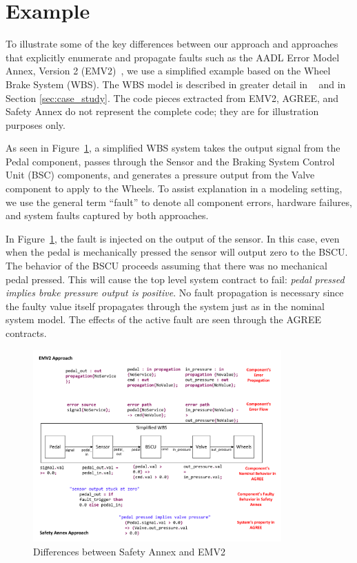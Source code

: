 \section{Example}
\label{sec:comparison_with_EMV2}

To illustrate some of the key differences between our approach and approaches that explicitly enumerate and propagate faults such as the AADL Error Model Annex, Version 2 (EMV2)~\cite{EMV2}, we use a simplified example based on the Wheel Brake System (WBS). The WBS model is described in greater detail in ~\cite{Stewart17:IMBSA} and in Section \ref{sec:case_study}. The code pieces extracted from EMV2, AGREE, and Safety Annex do not represent the complete code; they are for illustration purposes only.

As seen in Figure~\ref{fig:comparison_with_EMV2}, a simplified WBS system takes the output signal from the Pedal component, passes through the Sensor and the Braking System Control Unit (BSC) components, and generates a pressure output from the Valve component to apply to the Wheels. To assist explanation in a modeling setting, we use the general term ``fault'' to denote all component errors, hardware failures, and system faults captured by both approaches.

In Figure~\ref{fig:comparison_with_EMV2}, the fault is injected on the output of the sensor. In this case, even when the pedal is mechanically pressed the sensor will output zero to the BSCU. The behavior of the BSCU proceeds assuming that there was no mechanical pedal pressed. This will cause the top level system contract to fail: {\em pedal pressed implies brake pressure output is positive}. No fault propagation is necessary since the faulty value itself propagates through the system just as in the nominal system model. The effects of the active fault are seen through the AGREE contracts. 

\begin{figure}[h!]
	\vspace{-0.19in}
	\centering
	\includegraphics[trim=0 9 0 5,clip,width=0.85\textwidth]{images/Visio-Comparison_with_EMV2.pdf}
	\caption{Differences between Safety Annex and EMV2}
	\label{fig:comparison_with_EMV2}
\end{figure} 
 
